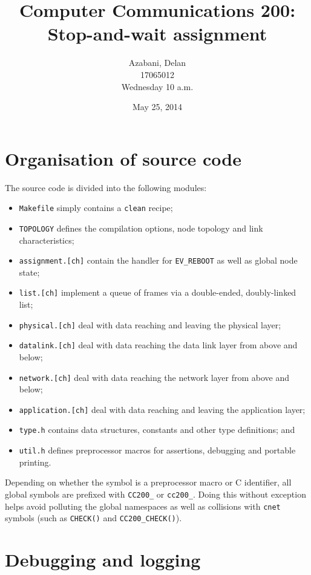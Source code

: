 \documentclass[a4paper,12pt,titlepage]{article}
\title{Computer Communications 200:\\
       Stop-and-wait assignment}
\date{May 25, 2014}
\author{Azabani, Delan\\17065012\\Wednesday 10 a.m.}
\begin{document}
\maketitle

\section{Organisation of source code}

The source code is divided into the following modules:

\begin{itemize}
	\item \texttt{Makefile} simply contains a \texttt{clean} recipe;
	\item \texttt{TOPOLOGY} defines the compilation options, node topology
	      and link characteristics;
	\item \texttt{assignment.[ch]} contain the handler for
	      \texttt{EV\_REBOOT} as well as global node state;
	\item \texttt{list.[ch]} implement a queue of frames via a
	      double-ended, doubly-linked list;
	\item \texttt{physical.[ch]} deal with data reaching and leaving the
	      physical layer;
	\item \texttt{datalink.[ch]} deal with data reaching the data link
	      layer from above and below;
	\item \texttt{network.[ch]} deal with data reaching the network
	      layer from above and below;
	\item \texttt{application.[ch]} deal with data reaching and leaving
	      the application layer;
	\item \texttt{type.h} contains data structures, constants and other
	      type definitions; and
	\item \texttt{util.h} defines preprocessor macros for assertions,
	      debugging and portable printing.
\end{itemize}

Depending on whether the symbol is a preprocessor macro or C identifier, all
global symbols are prefixed with \texttt{CC200\_} or \texttt{cc200\_}. Doing
this without exception helps avoid polluting the global namespaces as well as
collisions with \texttt{cnet} symbols (such as \texttt{CHECK()} and
\texttt{CC200\_CHECK()}).

\section{Debugging and logging}
\end{document}
